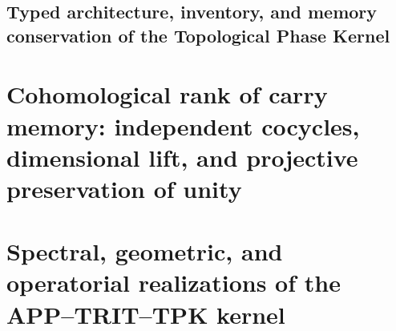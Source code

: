 \section{Typed architecture, inventory, and memory conservation of the Topological Phase Kernel}
\label{sec:sucesor-102-propietarios-tpk}
\begin{HMTScientificOwnerSubordinated}


\end{HMTScientificOwnerSubordinated}
\begin{HMTScientificOwnerSubordinated}

\end{HMTScientificOwnerSubordinated}















\chapter{Cohomological rank of carry memory: independent cocycles, dimensional lift, and projective preservation of unity}
\label{chap:sucesor-102-02}
\begin{HMTScientificOwnerSubordinated}

\end{HMTScientificOwnerSubordinated}

\chapter{Spectral, geometric, and operatorial realizations of the APP–TRIT–TPK kernel}
\label{chap:sucesor-102-03}

\label{owner:sucesor-102-03k-genealogia-operaciones}






